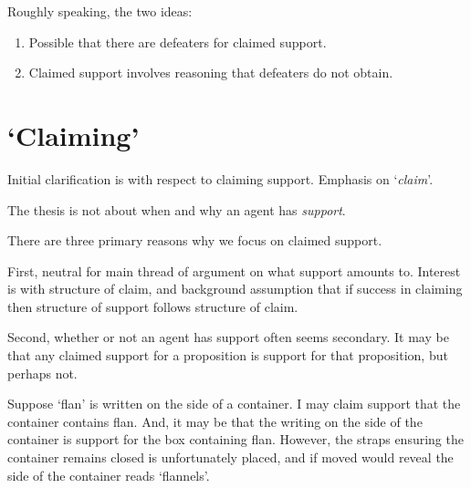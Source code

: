 \begin{note}
  Roughly speaking, the two ideas:
  \begin{enumerate}
  \item Possible that there are defeaters for claimed support.
  \item Claimed support involves reasoning that defeaters do not obtain.
  \end{enumerate}
\end{note}



\section{`Claiming'}
\label{sec:claiming}

\begin{note}
  Initial clarification is with respect to claiming support.
  Emphasis on `\emph{claim}'.

  The thesis is not about when and why an agent has \emph{support}.

  There are three primary reasons why we focus on claimed support.

  First, neutral for main thread of argument on what support amounts to.
  Interest is with structure of claim, and background assumption that if success in claiming then structure of support follows structure of claim.

  Second, whether or not an agent has support often seems secondary.
  It may be that any claimed support for a proposition is support for that proposition, but perhaps not.
  \begin{illustration}
    \label{illu:flan-nels}
    Suppose `flan' is written on the side of a container.
    I may claim support that the container contains flan.
    And, it may be that the writing on the side of the container is support for the box containing flan.
    However, the straps ensuring the container remains closed is unfortunately placed, and if moved would reveal the side of the container reads `flannels'.
  \end{illustration}


\end{note}
